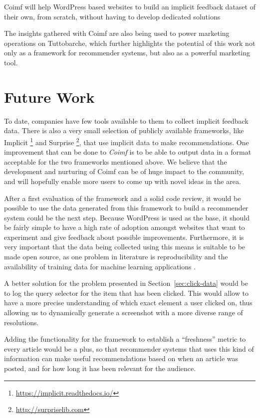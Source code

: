 \documentclass[sigconf,nonacm]{acmart}
\begin{document}
Coimf will help WordPress based websites to build an implicit feedback dataset
of their own, from scratch, without having to develop dedicated solutions 

The insights gathered with Coimf are also being used to power marketing operations
on Tuttobarche, which further highlights the potential of this work not only as
a framework for recommender systems, but also as a powerful marketing tool.

\section{Future Work}

To date, companies have few tools available to them to collect implicit feedback
data. There is also a very small selection of publicly available frameworks, like
Implicit
\footnote{\href{https://implicit.readthedocs.io/}{https://implicit.readthedocs.io/}}
and Surprise \footnote{\href{http://surpriselib.com}{http://surpriselib.com}},
that use implicit data to make recommendations. One improvement that can be done
to \textit{Coimf} is to be able to output data in a format acceptable for the two
frameworks mentioned above.
We believe that the development and nurturing of Coimf can be of huge impact to
the community, and will hopefully enable more users to come up with novel ideas
in the area.

After a first evaluation of the framework and a solid code review, it would be
possible to use the data generated from this framework to build a recommender
system could be the next step. Because WordPress is used as the base, it should
be fairly simple to have a high rate of adoption amongst websites that want to
experiment and give feedback about possible improvements. Furthermore, it is
very important that the data being collected using this means is suitable to be
made open source, as one problem in literature is reproducibility and the
availability of training data for machine learning applications \cite{joachims2017accurately}.

A better solution for the problem presented in Section~\ref{sec:click-data}
would be to log the query selector for the item that has been clicked. This
would allow to have a more precise understanding of which exact element a user
clicked on, thus allowing us to dynamically generate a screenshot with a more
diverse range of resolutions.

Adding the functionality for the framework to establish a ``freshness'' metric
to every article would be a plus, so that recommender systems that uses this
kind of information can make useful recommendations based on when an article was
posted, and for how long it has been relevant for the audience.
\end{document}
